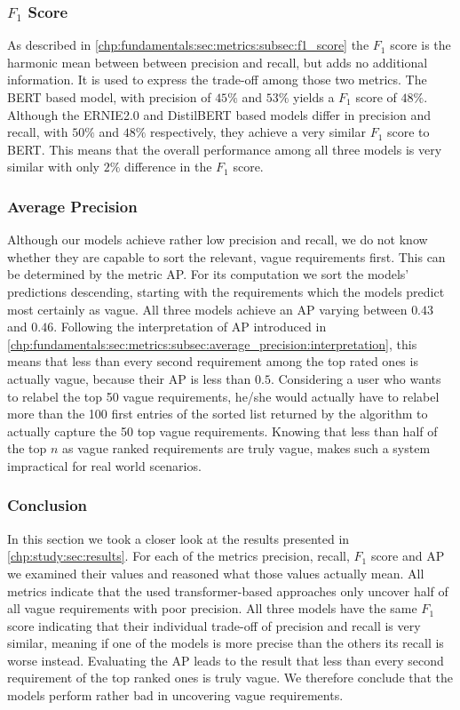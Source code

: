 \subsubsection{$F_1$ Score}
\label{chp:study:sec:interpretation:subsec:discussion:f1_score}
As described in \cref{chp:fundamentals:sec:metrics:subsec:f1_score} the $F_1$ score is the harmonic mean between between precision and recall, but adds no additional information.
It is used to express the trade-off among those two metrics.
The \ac{BERT} based model, with precision of $45\%$ and $53\%$ yields a $F_1$ score of $48\%$.
Although the \ac{ERNIE2.0} and \ac{DistilBERT} based models differ in precision and recall, with $50\%$ and $48\%$ respectively, they achieve a very similar $F_1$ score to \ac{BERT}.
This means that the overall performance among all three models is very similar with only $2\%$ difference in the $F_1$ score.

\subsubsection{Average Precision}
\label{chp:study:sec:interpretation:subsec:discussion:average_precision}
Although our models achieve rather low precision and recall, we do not know whether they are capable to sort the relevant, vague requirements first.
This can be determined by the metric \ac{AP}.
For its computation we sort the models' predictions descending, starting with the requirements which the models predict most certainly as vague.
All three models achieve an \ac{AP} varying between $0.43$ and $0.46$.
Following the interpretation of \ac{AP} introduced in \cref{chp:fundamentals:sec:metrics:subsec:average_precision:interpretation}, this means that less than every second requirement among the top rated ones is actually vague, because their \ac{AP} is less than $0.5$.
Considering a user who wants to relabel the top 50 vague requirements, he/she would actually have to relabel more than the 100 first entries of the sorted list returned by the algorithm to actually capture the 50 top vague requirements.
Knowing that less than half of the top $n$ as vague ranked requirements are truly vague, makes such a system impractical for real world scenarios.

\subsubsection{Conclusion}
\label{chp:study:sec:interpretation:subsec:discussion:usability}
In this section we took a closer look at the results presented in \cref{chp:study:sec:results}.
For each of the metrics precision, recall, $F_1$ score and \ac{AP} we examined their values and reasoned what those values actually mean.
All metrics indicate that the used transformer-based approaches only uncover half of all vague requirements with poor precision.
All three models have the same $F_1$ score indicating that their individual trade-off of precision and recall is very similar, meaning if one of the models is more precise than the others its recall is worse instead.
Evaluating the \ac{AP} leads to the result that less than every second requirement of the top ranked ones is truly vague.
We therefore conclude that the models perform rather bad in uncovering vague requirements.
